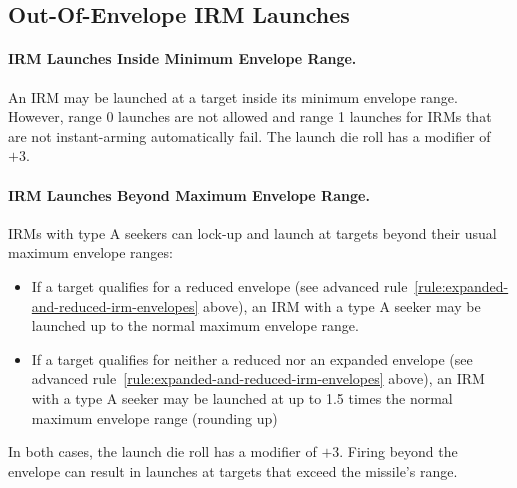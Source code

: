 \begin{advancedrules}
{\section{Out-Of-Envelope IRM Launches}\label{rule:irm-out-of-envelope-launches} 



\paragraph{IRM Launches Inside Minimum Envelope Range.} An IRM may be launched at a target inside its minimum envelope range. However, range 0 launches are not allowed and range 1 launches for IRMs that are not instant-arming automatically fail. The launch die roll has a modifier of $+3$.

\paragraph{IRM Launches Beyond Maximum Envelope Range.}
IRMs with type A seekers can lock-up and launch at targets beyond their usual maximum envelope ranges:
\begin{itemize}
\item If a target qualifies for a reduced envelope (see advanced rule~\ref{rule:expanded-and-reduced-irm-envelopes} above), an IRM with a type A seeker may be launched up to the normal maximum envelope range.
\item If a target qualifies for neither a reduced nor an expanded envelope (see advanced rule~\ref{rule:expanded-and-reduced-irm-envelopes} above), an IRM with a type A seeker may be launched at up to 1.5 times the normal maximum envelope range (rounding up)
\end{itemize}
In both cases, the launch die roll has a modifier of $+3$. Firing beyond the envelope can result in launches at targets that exceed the missile's range.





}
\end{advancedrules}
